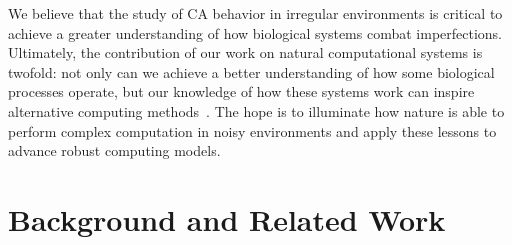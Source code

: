 \documentclass[a4paper,11pt]{article}
\begin{document}
We believe that the study of CA behavior in irregular environments is critical to achieve a greater understanding of how biological systems combat imperfections. Ultimately, the contribution of our work on natural computational systems is twofold: not only can we achieve a better understanding of how some biological processes operate, but our knowledge of how these systems work can inspire alternative computing methods~\cite{ma96, si04}. The hope is to illuminate how nature is able to perform complex computation in noisy environments and apply these lessons to advance robust computing models.

\section{Background and Related Work}
\label{sec:Back}

\end{document}
